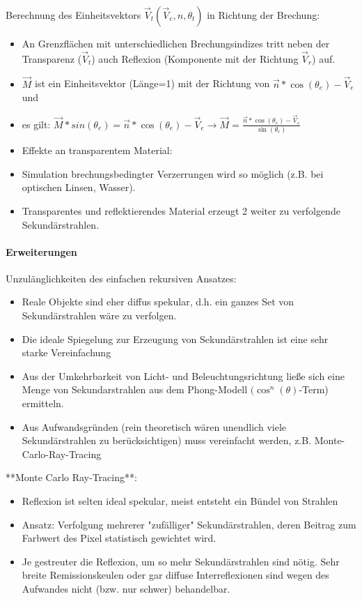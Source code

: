 \documentclass[10pt,landscape]{article}
\begin{document}
\begin{multicols}{3}
{  Berechnung des Einheitsvektors $\vec{V}_t(\vec{V}_e,n,\theta_t)$ in Richtung der Brechung:
  \begin{itemize}
    \item An Grenzflächen mit unterschiedlichen Brechungsindizes tritt neben der Transparenz ($\vec{V}_t$) auch Reflexion (Komponente mit der Richtung $\vec{V}_r$) auf.
    \item $\vec{M}$ ist ein Einheitsvektor (Länge=1) mit der Richtung von $\vec{n}*\cos(\theta_e)-\vec{V}_e$ und
    \item es gilt: $\vec{M}*sin(\theta_e)=\vec{n}*\cos(\theta_e)-\vec{V}_e \rightarrow \vec{M}=\frac{\vec{n}*\cos(\theta_e)-\vec{V}_e}{\sin(\theta_e)}$
    \item Effekte an transparentem Material:
    \item Simulation brechungsbedingter Verzerrungen wird so möglich (z.B. bei optischen Linsen, Wasser).
    \item Transparentes und reflektierendes Material erzeugt 2 weiter zu verfolgende Sekundärstrahlen.
  \end{itemize}
  
  
  
  \paragraph{Erweiterungen}
  Unzulänglichkeiten des einfachen rekursiven Ansatzes:
  \begin{itemize}
    \item Reale Objekte sind eher diffus spekular, d.h. ein ganzes Set von Sekundärstrahlen wäre zu verfolgen.
    \item Die ideale Spiegelung zur Erzeugung von Sekundärstrahlen ist eine sehr starke Vereinfachung
    \item Aus der Umkehrbarkeit von Licht- und Beleuchtungsrichtung ließe sich eine Menge von Sekundarstrahlen aus dem Phong-Modell $(\cos^n(\theta)$-Term) ermitteln.
    \item Aus Aufwandsgründen (rein theoretisch wären unendlich viele Sekundärstrahlen zu berücksichtigen) muss vereinfacht werden, z.B. Monte-Carlo-Ray-Tracing
  \end{itemize}
  
  **Monte Carlo Ray-Tracing**:
  \begin{itemize}
    \item Reflexion ist selten ideal spekular, meist entsteht ein Bündel von Strahlen
    \item Ansatz: Verfolgung mehrerer "zufälliger" Sekundärstrahlen, deren Beitrag zum Farbwert des Pixel statistisch gewichtet wird.
    \item Je gestreuter die Reflexion, um so mehr Sekundärstrahlen sind nötig. Sehr breite Remissionskeulen oder gar diffuse Interreflexionen sind wegen des Aufwandes nicht (bzw. nur schwer) behandelbar.
  \end{itemize}
  
}
\end{multicols}
\end{document}
